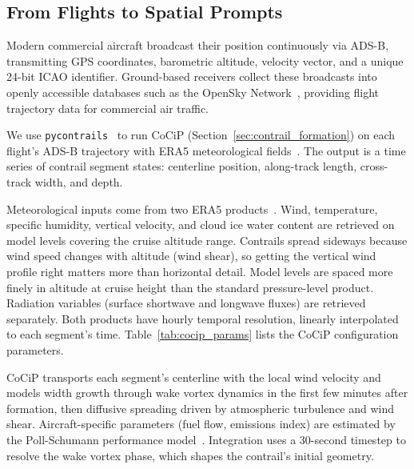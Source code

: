 \documentclass[review]{elsarticle}
\begin{document}
\subsection{From Flights to Spatial Prompts}

Modern commercial aircraft broadcast their position continuously via ADS-B, transmitting GPS coordinates, barometric altitude, velocity vector, and a unique 24-bit ICAO identifier. Ground-based receivers collect these broadcasts into openly accessible databases such as the OpenSky Network~\cite{schafer2014opensky}, providing flight trajectory data for commercial air traffic.

We use \texttt{pycontrails}~\cite{pycontrails} to run CoCiP (Section~\ref{sec:contrail_formation}) on each flight's ADS-B trajectory with ERA5 meteorological fields~\cite{hersbach2020era5}. The output is a time series of contrail segment states: centerline position, along-track length, cross-track width, and depth.

Meteorological inputs come from two ERA5 products~\cite{hersbach2020era5}. Wind, temperature, specific humidity, vertical velocity, and cloud ice water content are retrieved on model levels covering the cruise altitude range. Contrails spread sideways because wind speed changes with altitude (wind shear), so getting the vertical wind profile right matters more than horizontal detail. Model levels are spaced more finely in altitude at cruise height than the standard pressure-level product. Radiation variables (surface shortwave and longwave fluxes) are retrieved separately. Both products have hourly temporal resolution, linearly interpolated to each segment's time. Table~\ref{tab:cocip_params} lists the CoCiP configuration parameters.

CoCiP transports each segment's centerline with the local wind velocity and models width growth through wake vortex dynamics in the first few minutes after formation, then diffusive spreading driven by atmospheric turbulence and wind shear. Aircraft-specific parameters (fuel flow, emissions index) are estimated by the Poll-Schumann performance model~\cite{poll2021estimation}. Integration uses a 30-second timestep to resolve the wake vortex phase, which shapes the contrail's initial geometry.
\end{document}
